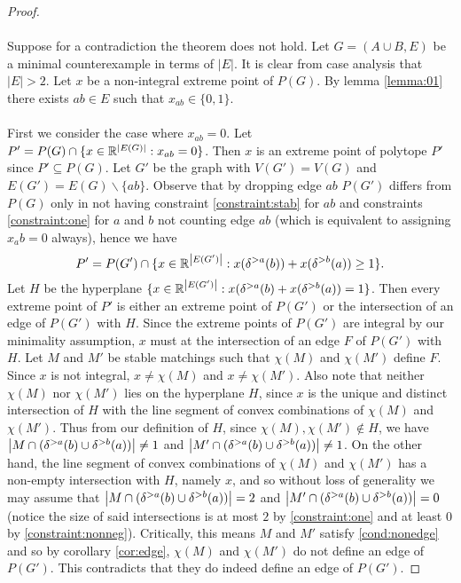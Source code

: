 \begin{proof}
\paragraph{}
Suppose for a contradiction the theorem does not hold. Let $G=(A\cup B, E)$ be a minimal counterexample in terms of $|E|$. It is clear from case analysis that $|E| > 2$. Let $x$ be a non-integral extreme point of $P(G)$. By lemma \ref{lemma:01} there exists $ab \in E$ such that $x_{ab} \in \{0,1\}$.
\paragraph{}
First we consider the case where $x_{ab} = 0$. Let $P' = P(G) \cap \{x \in \mathbb{R}^{\left|E(G)\right|} : x_{ab} = 0 \}$. Then $x$ is an extreme point of polytope $P'$ since $P' \subseteq P(G)$. Let $G'$ be the graph with $V(G') = V(G)$ and $E(G') = E(G) \backslash \{ab\}$. Observe that by dropping edge $ab$ $P(G')$ differs from $P(G)$ only in not having constraint \ref{constraint:stab} for $ab$ and constraints \ref{constraint:one} for $a$ and $b$ not counting edge $ab$ (which is equivalent to assigning $x_ab = 0$ always), hence we have
$$P' = P(G') \cap \{x \in \mathbb{R}^{\left|E(G')\right|} : x(\delta^{>a}(b)) + x(\delta^{>b}(a)) \geq 1 \}.$$
Let $H$ be the hyperplane $\{x \in \mathbb{R}^{\left|E(G')\right|} : x(\delta^{>a}(b) + x(\delta^{>b}(a)) = 1\}$. Then every extreme point of $P'$ is either an extreme point of $P(G')$ or the intersection of an edge of $P(G')$ with $H$. Since the extreme points of $P(G')$ are integral by our minimality assumption, $x$ must at the intersection of an edge $F$ of $P(G')$ with $H$. Let $M$ and $M'$ be stable matchings such that $\chi(M)$ and $\chi(M')$ define $F$. Since $x$ is not integral, $x \neq \chi(M)$ and $x \neq \chi(M')$. Also note that neither $\chi(M)$ nor $\chi(M')$ lies on the hyperplane $H$, since $x$ is the unique and distinct intersection of $H$ with the line segment of convex combinations of $\chi(M)$ and $\chi(M')$. Thus from our definition of $H$, since $\chi(M), \chi(M') \not\in H$,  we have $\left|M \cap (\delta^{>a}(b) \cup \delta^{>b}(a))\right| \neq 1$ and $\left|M' \cap (\delta^{>a}(b) \cup \delta^{>b}(a))\right| \neq 1$. On the other hand, the line segment of convex combinations of $\chi(M)$ and $\chi(M')$ has a non-empty intersection with $H$, namely $x$,  and so without loss of generality we may assume that $\left|M \cap (\delta^{>a}(b) \cup \delta^{>b}(a))\right| = 2$ and $\left|M' \cap (\delta^{>a}(b) \cup \delta^{>b}(a))\right| = 0$ (notice the size of said intersections is at most $2$ by \ref{constraint:one} and at least $0$ by \ref{constraint:nonneg}). Critically, this means $M$ and $M'$ satisfy \ref{cond:nonedge} and so by corollary \ref{cor:edge}, $\chi(M)$ and $\chi(M')$ do not define an edge of $P(G')$. This contradicts that they do indeed define an edge of $P(G')$.

\end{proof}
